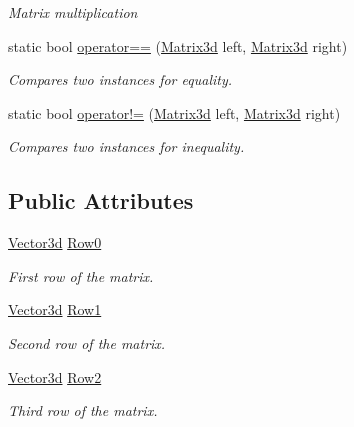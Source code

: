 \begin{DoxyCompactItemize}
\begin{DoxyCompactList}\small\item\em Matrix multiplication \end{DoxyCompactList}\item 
static bool \hyperlink{struct_open_t_k_1_1_matrix3d_aad680f0d8bf3afb863bf7b181da4e13c}{operator==} (\hyperlink{struct_open_t_k_1_1_matrix3d}{Matrix3d} left, \hyperlink{struct_open_t_k_1_1_matrix3d}{Matrix3d} right)
\begin{DoxyCompactList}\small\item\em Compares two instances for equality. \end{DoxyCompactList}\item 
static bool \hyperlink{struct_open_t_k_1_1_matrix3d_a8cf1f44b7bca8792c87af22bbc268fc0}{operator!=} (\hyperlink{struct_open_t_k_1_1_matrix3d}{Matrix3d} left, \hyperlink{struct_open_t_k_1_1_matrix3d}{Matrix3d} right)
\begin{DoxyCompactList}\small\item\em Compares two instances for inequality. \end{DoxyCompactList}\end{DoxyCompactItemize}
\subsection*{Public Attributes}
\begin{DoxyCompactItemize}
\item 
\hyperlink{struct_open_t_k_1_1_vector3d}{Vector3d} \hyperlink{struct_open_t_k_1_1_matrix3d_a2c616fb0267321624e19c5fa1ed13f74}{Row0}
\begin{DoxyCompactList}\small\item\em First row of the matrix. \end{DoxyCompactList}\item 
\hyperlink{struct_open_t_k_1_1_vector3d}{Vector3d} \hyperlink{struct_open_t_k_1_1_matrix3d_ad32f2af61903b2b8893492334e779351}{Row1}
\begin{DoxyCompactList}\small\item\em Second row of the matrix. \end{DoxyCompactList}\item 
\hyperlink{struct_open_t_k_1_1_vector3d}{Vector3d} \hyperlink{struct_open_t_k_1_1_matrix3d_a22cab640b562a8d0ce92adb1842421d1}{Row2}
\begin{DoxyCompactList}\small\item\em Third row of the matrix. \end{DoxyCompactList}\end{DoxyCompactItemize}
